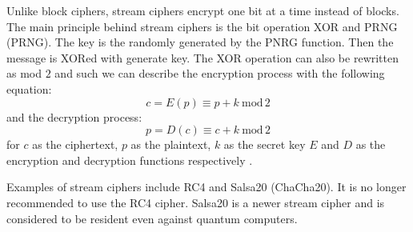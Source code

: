 Unlike block ciphers, stream ciphers encrypt one bit at a time instead of blocks. The main principle behind stream ciphers is the bit operation XOR and PRNG (\acl{PRNG}). The key is the randomly generated by the PNRG function. Then the message is XORed with generate key. The XOR operation can also be rewritten as mod $2$ and such we can describe the encryption process with the following equation:
\begin{equation}
  c = E(p)\equiv p + k\ \mathrm{mod}\,2
\end{equation}
\noindent and the decryption process:
\begin{equation}
  p = D(c)\equiv c + k\ \mathrm{mod}\,2
\end{equation}
\noindent for $c$ as the ciphertext, $p$ as the plaintext, $k$ as the secret key $E$ and $D$ as the encryption and decryption functions respectively \cite{Paar2010}.

Examples of stream ciphers include RC4 and Salsa20 (ChaCha20). It is no longer recommended to use the RC4 cipher. Salsa20 is a newer stream cipher and is considered to be resident even against quantum computers. \cite{Bernstein149}\cite{Ristic2014}
